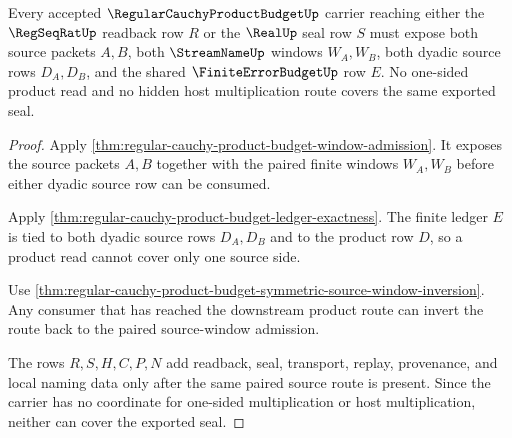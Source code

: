 \begin{theorem}
\label{thm:regular-cauchy-product-budget-source-coverage}
Every accepted $\RegularCauchyProductBudgetUp$ carrier reaching either the $\RegSeqRatUp$ readback row $R$ or the $\RealUp$ seal row $S$ must expose both source packets $A,B$, both $\StreamNameUp$ windows $W_A,W_B$, both dyadic source rows $D_A,D_B$, and the shared $\FiniteErrorBudgetUp$ row $E$. No one-sided product read and no hidden host multiplication route covers the same exported seal.
\end{theorem}
\begin{proof}
Apply \autoref{thm:regular-cauchy-product-budget-window-admission}. It exposes the source packets $A,B$ together with the paired finite windows $W_A,W_B$ before either dyadic source row can be consumed.

Apply \autoref{thm:regular-cauchy-product-budget-ledger-exactness}. The finite ledger $E$ is tied to both dyadic source rows $D_A,D_B$ and to the product row $D$, so a product read cannot cover only one source side.

Use \autoref{thm:regular-cauchy-product-budget-symmetric-source-window-inversion}. Any consumer that has reached the downstream product route can invert the route back to the paired source-window admission.

The rows $R,S,H,C,P,N$ add readback, seal, transport, replay, provenance, and local naming data only after the same paired source route is present. Since the carrier has no coordinate for one-sided multiplication or host multiplication, neither can cover the exported seal.
\end{proof}

